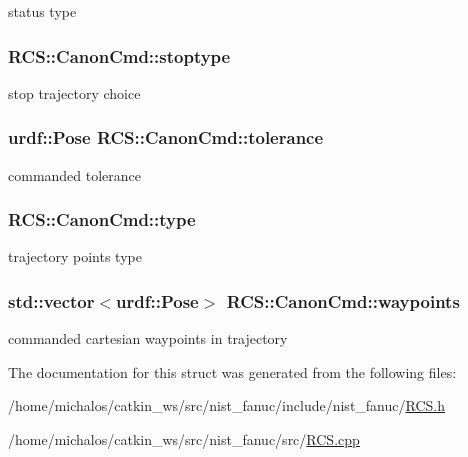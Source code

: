 status type \hypertarget{structRCS_1_1CanonCmd_a22bc418b884c7afabf0a2d3538f74cad}{
\subsubsection[{stoptype}]{ R\-C\-S\-::\-Canon\-Cmd\-::stoptype}}\label{structRCS_1_1CanonCmd_a22bc418b884c7afabf0a2d3538f74cad}
stop trajectory choice \hypertarget{structRCS_1_1CanonCmd_ac63c0ceb70f14cc186a098e2a49d0095}{
\subsubsection[{tolerance}]{\setlength{\rightskip}{0pt plus 5cm}urdf\-::\-Pose R\-C\-S\-::\-Canon\-Cmd\-::tolerance}}\label{structRCS_1_1CanonCmd_ac63c0ceb70f14cc186a098e2a49d0095}
commanded tolerance \hypertarget{structRCS_1_1CanonCmd_abf1d51c90a3f1b4c5796292c53cbde01}{
\subsubsection[{type}]{ R\-C\-S\-::\-Canon\-Cmd\-::type}}\label{structRCS_1_1CanonCmd_abf1d51c90a3f1b4c5796292c53cbde01}
trajectory points type \hypertarget{structRCS_1_1CanonCmd_a331711f225f615e8efeaa8cc4b050147}{
\subsubsection[{waypoints}]{\setlength{\rightskip}{0pt plus 5cm}std\-::vector$<$urdf\-::\-Pose$>$ R\-C\-S\-::\-Canon\-Cmd\-::waypoints}}\label{structRCS_1_1CanonCmd_a331711f225f615e8efeaa8cc4b050147}
commanded cartesian waypoints in trajectory 

The documentation for this struct was generated from the following files\-:\begin{DoxyCompactItemize}
\item 
/home/michalos/catkin\-\_\-ws/src/nist\-\_\-fanuc/include/nist\-\_\-fanuc/\hyperlink{RCS_8h}{R\-C\-S.\-h}\item 
/home/michalos/catkin\-\_\-ws/src/nist\-\_\-fanuc/src/\hyperlink{RCS_8cpp}{R\-C\-S.\-cpp}\end{DoxyCompactItemize}
